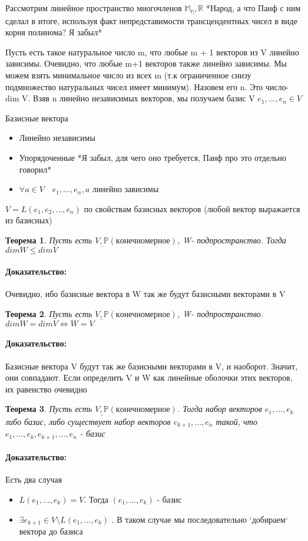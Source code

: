 \documentclass[l1pt]{article}
\newtheorem{theorem}{Теорема}
\newenvironment{proof}{\paragraph{Доказательство:}}{\hfill\newline}
\begin{document}
\begin{flushleft}
Рассмотрим линейное пространство многочленов $\underline{\mathbb{M_n}, \mathbb{R}}$ *Народ, а что Панф с ним сделал в итоге, используя факт непредставимости трансцендентных чисел в виде корня полинома? Я забыл*\newline

Пусть есть такое натуральное число m, что любые m + 1 векторов из V линейно зависимы. Очевидно, что любые m+1 векторов также линейно зависимы. Мы можем взять минимальное число из всех m (т.к ограниченное  снизу подмножество натуральных чисел имеет минимум). Назовем его n. Это число- dim V. Взяв n линейно независимых векторов, мы получаем базис V $e_1, ... , e_n \in V$

Базисные вектора 
\begin{itemize}
 \item Линейно независимы
 \item Упорядоченные *Я забыл, для чего оно требуется, Панф про это отдельно говорил*
 \item $\forall a \in V \quad e_1, ... , e_n, a$ линейно зависимы
\end{itemize}

$V = L(e_1, e_2, ..., e_n)$ по свойствам базисных векторов (любой вектор выражается из базисных)
\end{flushleft}


\begin{theorem}
    Пусть есть $\underline{V, \mathbb{P}} (конечномерное)$, W- подпространство. Тогда $dim W \leqslant dim V$
\end{theorem}
\begin{proof}
    Очевидно, ибо базисные вектора в W так же будут базисными векторами в V
\end{proof}

\begin{theorem}
    Пусть есть $\underline{V, \mathbb{P}} (конечномерное)$, W- подпространство. $dim W = dim V \iff W = V$
\end{theorem}
\begin{proof}
    Базисные вектора V будут так же базисными векторами в V, и наоборот. Значит, они совпадают. Если определить V и W как линейные оболочки этих векторов, их равенство очевидно
\end{proof}

\begin{theorem}
    Пусть есть $\underline{V, \mathbb{P}} (конечномерное)$. Тогда набор векторов  $e_1, ... , e_k$ либо базис, либо существует набор векторов $e_{k + 1}, ... , e_n$ такой, что $e_1, ... , e_k, e_{k+1}, ... , e_n$ - базис
\end{theorem}
\begin{proof}
    Есть два случая 
    \begin{itemize}
        \item $L(e_1, ... , e_k) = V$. Тогда $(e_1, ... , e_k)$ - базис
        \item $\exists e_{k+1} \in V \setminus L(e_1, ... , e_k)$ . В таком случае мы последовательно `добираем` вектора до базиса
\end{itemize}
\end{proof}
\end{document}
